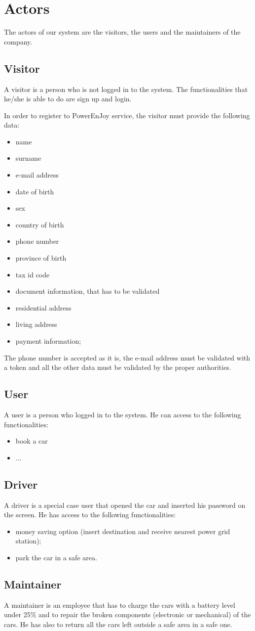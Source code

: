 \section{Actors}
The actors of our system are the visitors, the users and the maintainers of the company.

\subsection{Visitor}
A visitor is a person who is not logged in to the system. The functionalities that he/she is able to do are sign up and login.

In order to register to PowerEnJoy service, the visitor must provide the following data:
\begin{itemize}
	\item name
	\item surname
	\item e-mail address
	\item date of birth
	\item sex
	\item country of birth
	\item phone number
	\item province of birth
	\item tax id code %
	\item document information, that has to be validated
	\item residential address
	\item living address
	\item payment information;
\end{itemize}

The phone number is accepted as it is, the e-mail address must be validated with a token and all
the other data must be validated by the proper authorities.

\subsection{User}
A user is a person who logged in to the system. He can access to the following functionalities:
\begin{itemize}
	\item book a car
	\item ...
\end{itemize}

\subsection{Driver}
A driver is a special case user that opened the car and inserted his password on the screen. He has access to the following functionalities:
\begin{itemize}
	\item money saving option (insert destination and receive nearest power grid station);
	\item park the car in a safe area.
\end{itemize}

\subsection{Maintainer}
A maintainer is an employee that has to charge the cars with a battery level under 25\% and to repair the broken components (electronic or mechanical) of the cars. He has also to return all the cars left outside a safe area in a safe one.